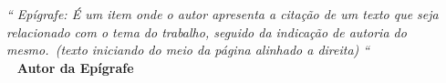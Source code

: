 \def\textoEpigrafe{
  Epígrafe: É um item onde o autor 
  apresenta a citação de um texto 
  que seja relacionado com o tema
  do trabalho, seguido da indicação 
  de autoria do mesmo.\ (texto iniciando 
  do meio da página alinhado a direita)
}

\def\autorEpigrafe{Autor da Epígrafe}

\begin{epigrafe}
  \vspace*{\fill}
  \hfill{}
  \parbox{6cm}{
    \begin{flushright}
      \textit{``\textoEpigrafe``}\\
      \bigbreak\
      \textbf{\autorEpigrafe}
  
    \end{flushright}
  }
\end{epigrafe}